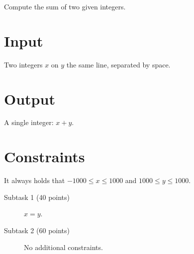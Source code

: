 
Compute the sum of two given integers.

\section*{Input}

Two integers $x$ on $y$ the same line, separated by space.

\section*{Output}

A single integer: $x+y$.

\section*{Constraints}

It always holds that 
$-1000 \leq x \leq 1000$
and
$1000 \leq y \leq 1000$.

\begin{description}
\item[Subtask 1 (40 points)] $x=y$.
\item[Subtask 2 (60 points)] No additional constraints.
\end{description}

